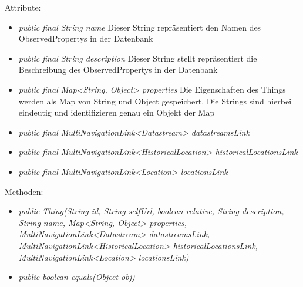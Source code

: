Attribute:
\begin{itemize}
    \item \emph{public final String name} Dieser String repräsentiert den Namen des ObservedPropertys in der Datenbank
    \item \emph{public final String description} Dieser String stellt repräsentiert die Beschreibung des ObservedPropertys in der Datenbank
    \item \emph{public final Map<String, Object> properties} Die Eigenschaften des Things werden als Map von String und Object gespeichert. Die Strings sind hierbei eindeutig und identifizieren genau ein Objekt der Map
    \item \emph{public final MultiNavigationLink<Datastream> datastreamsLink} 
    \item \emph{public final MultiNavigationLink<HistoricalLocation> historicalLocationsLink} 
    \item \emph{public final MultiNavigationLink<Location> locationsLink} 
\end{itemize}
Methoden:
\begin{itemize}
    \item \emph{public Thing(String id, String selfUrl, boolean relative, String description, String name, Map<String, Object> properties, MultiNavigationLink<Datastream> datastreamsLink, MultiNavigationLink<HistoricalLocation> historicalLocationsLink, MultiNavigationLink<Location> locationsLink)}
    \item \emph{public boolean equals(Object obj)} 
\end{itemize}

